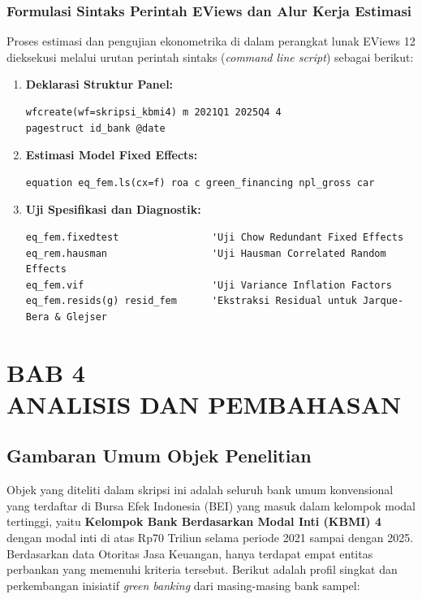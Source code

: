 \documentclass[12pt,a4paper]{article}
\numberwithin{equation}{section}
\begin{document}
\subsubsection{Formulasi Sintaks Perintah EViews dan Alur Kerja Estimasi}
\noindent
Proses estimasi dan pengujian ekonometrika di dalam perangkat lunak EViews 12 dieksekusi melalui urutan perintah sintaks (\emph{command line script}) sebagai berikut:
\begin{enumerate}
  \item \textbf{Deklarasi Struktur Panel:}
\begin{verbatim}
wfcreate(wf=skripsi_kbmi4) m 2021Q1 2025Q4 4
pagestruct id_bank @date
\end{verbatim}
  \item \textbf{Estimasi Model Fixed Effects:}
\begin{verbatim}
equation eq_fem.ls(cx=f) roa c green_financing npl_gross car
\end{verbatim}
  \item \textbf{Uji Spesifikasi dan Diagnostik:}
\begin{verbatim}
eq_fem.fixedtest                'Uji Chow Redundant Fixed Effects
eq_rem.hausman                  'Uji Hausman Correlated Random Effects
eq_fem.vif                      'Uji Variance Inflation Factors
eq_fem.resids(g) resid_fem      'Ekstraksi Residual untuk Jarque-Bera & Glejser
\end{verbatim}
\end{enumerate}

\newpage
\setcounter{section}{0}
\section*{BAB 4\\[0.3cm]ANALISIS DAN PEMBAHASAN}
\setcounter{section}{4}
\setcounter{subsection}{0}
\setcounter{equation}{0}

\subsection{Gambaran Umum Objek Penelitian}

\noindent
Objek yang diteliti dalam skripsi ini adalah seluruh bank umum konvensional yang terdaftar di Bursa Efek Indonesia (BEI) yang masuk dalam kelompok modal tertinggi, yaitu \textbf{Kelompok Bank Berdasarkan Modal Inti (KBMI) 4} dengan modal inti di atas Rp70 Triliun selama periode 2021 sampai dengan 2025. Berdasarkan data Otoritas Jasa Keuangan, hanya terdapat empat entitas perbankan yang memenuhi kriteria tersebut. Berikut adalah profil singkat dan perkembangan inisiatif \emph{green banking} dari masing-masing bank sampel:
\end{document}
